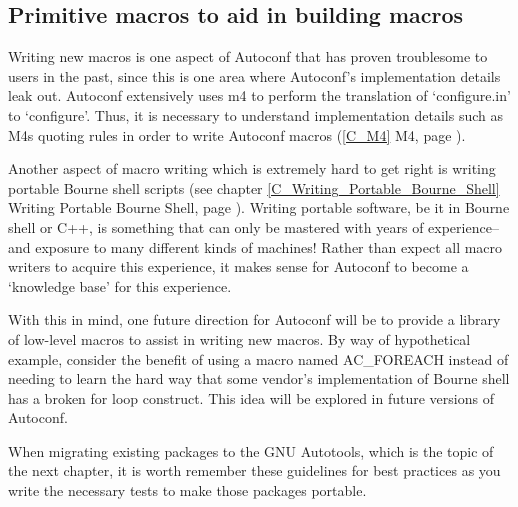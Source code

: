 \subsection{Primitive macros to aid in building macros}

Writing new macros is one aspect of Autoconf that has proven troublesome to 
users in the past, since this is one area where Autoconf's implementation 
details leak out. Autoconf extensively uses m4 to perform the translation 
of `configure.in' to `configure'. Thus, it is necessary to understand 
implementation details such as M4s quoting rules in order to write Autoconf 
macros (\ref{C_M4} M4, page \pageref{C_M4}).

Another aspect of macro writing which is extremely hard to get right is 
writing portable Bourne shell scripts
(see chapter \ref{C_Writing_Portable_Bourne_Shell}
Writing Portable Bourne Shell, page \pageref{C_Writing_Portable_Bourne_Shell}).
Writing portable software, be it in Bourne shell or C++, is something that can only be mastered with years of experience--and exposure to many different kinds of machines! Rather than expect all macro writers to acquire this experience, it makes sense for Autoconf to become a `knowledge base' for this experience.

With this in mind, one future direction for Autoconf will be to provide a library of low-level macros to assist in writing new macros. By way of hypothetical example, consider the benefit of using a macro named AC\_{}FOREACH instead of needing to learn the hard way that some vendor's implementation of Bourne shell has a broken for loop construct. This idea will be explored in future versions of Autoconf.

When migrating existing packages to the GNU Autotools, which is the topic of the next chapter, it is worth remember these guidelines for best practices as you write the necessary tests to make those packages portable. 


